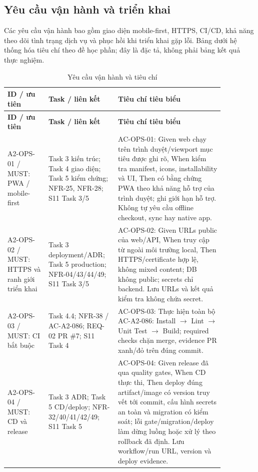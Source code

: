 \subsection{Yêu cầu vận hành và triển khai}
Các yêu cầu vận hành bao gồm giao diện mobile-first, HTTPS, CI/CD, khả năng theo dõi tình trạng dịch vụ và phục hồi khi triển khai gặp lỗi. Bảng dưới hệ thống hóa tiêu chí theo đề học phần; đây là đặc tả, không phải bảng kết quả thực nghiệm.
\par
\begingroup\small
\renewcommand{\arraystretch}{1.2}
\begin{longtable}{>{\raggedright\arraybackslash}p{0.17\linewidth}>{\raggedright\arraybackslash}p{0.25\linewidth}>{\raggedright\arraybackslash}p{0.44\linewidth}}
\caption{Yêu cầu vận hành và tiêu chí}\label{tab:auto-requirements-summary-2}\\
\hline
\textbf{ID / ưu tiên} & \textbf{Task / liên kết} & \textbf{Tiêu chí tiêu biểu} \\ \hline
\endfirsthead
\textbf{ID / ưu tiên} & \textbf{Task / liên kết} & \textbf{Tiêu chí tiêu biểu} \\ \hline
\endhead
A2-OPS-01 / MUST: PWA / mobile-first & Task 3 kiến trúc; Task 4 giao diện; Task 5 kiểm chứng; NFR-25, NFR-28; S11 Task 3/5 & AC-OPS-01: Given web chạy trên trình duyệt/viewport mục tiêu được ghi rõ, When kiểm tra manifest, icons, installability và UI, Then có bằng chứng PWA theo khả năng hỗ trợ của trình duyệt; ghi giới hạn hỗ trợ. Không tự yêu cầu offline checkout, sync hay native app. \\ \hline
A2-OPS-02 / MUST: HTTPS và ranh giới triển khai & Task 3 deployment/ADR; Task 5 production; NFR-04/43/44/49; S11 Task 3/5 & AC-OPS-02: Given URLs public của web/API, When truy cập từ ngoài môi trường local, Then HTTPS/certificate hợp lệ, không mixed content; DB không public; secrets chỉ backend. Lưu URLs và kết quả kiểm tra không chứa secret. \\ \hline
A2-OPS-03 / MUST: CI bắt buộc & Task 4.4; NFR-38 / AC-A2-086; REQ-02 PR \#7; S11 Task 4 & AC-OPS-03: Thực hiện toàn bộ AC-A2-086: Install  $\rightarrow$  Lint  $\rightarrow$  Unit Test  $\rightarrow$  Build; required checks chặn merge, evidence PR xanh/đỏ trên đúng commit. \\ \hline
A2-OPS-04 / MUST: CD và release & Task 3 ADR; Task 5 CD/deploy; NFR-32/40/41/42/49; S11 Task 5 & AC-OPS-04: Given release đã qua quality gates, When CD thực thi, Then deploy đúng artifact/image có version truy vết tới commit, cấu hình secrets an toàn và migration có kiểm soát; lỗi gate/migration/deploy làm dừng luồng hoặc xử lý theo rollback đã định. Lưu workflow/run URL, version và deploy evidence. \\ \hline

\end{longtable}
